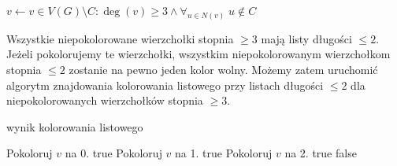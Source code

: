 \begin{algorithm}[H]
	\caption{Sprawdzenie 3-kolorowalności grafu}
	\begin{algorithmic}[1]
		\State $v \gets v \in V(G) \setminus C: \deg(v) \geq 3 \land \forall_{u\in N(v)}\; u \notin C$
			\State \parbox[t]{390pt}{Wszystkie niepokolorowane wierzchołki stopnia $\geq 3$ mają listy długości $\leq 2$. Jeżeli pokolorujemy te wierzchołki, wszystkim niepokolorowanym wierzchołkom stopnia $\leq 2$ zostanie na pewno jeden kolor wolny. Możemy zatem uruchomić algorytm znajdowania kolorowania listowego przy listach długości $\leq 2$ dla niepokolorowanych wierzchołków stopnia $\geq 3$.\strut}
			\State \Return wynik kolorowania listowego
		\EndIf
		
		\State
		\State Pokoloruj $v$ na 0.
			\State \Return \textsf{true}
		\EndIf
		\State
		\State Pokoloruj $v$ na 1.
			\State \Return \textsf{true}
		\EndIf
		\State
		\State Pokoloruj $v$ na 2.
			\State \Return \textsf{true}
		\EndIf
		\State
		\State \Return \textsf{false}
		
		\EndProcedure
	\end{algorithmic}
\end{algorithm}
